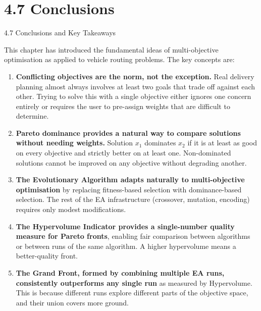 \documentclass[aspectratio=169,10pt]{beamer}
\begin{document}
\section{4.7 Conclusions}

\begin{frame}[allowframebreaks]{4.7 Conclusions and Key Takeaways}

  This chapter has introduced the fundamental ideas of multi-objective
  optimisation as applied to vehicle routing problems.  The key concepts are:

  \begin{enumerate}
    \item \textbf{Conflicting objectives are the norm, not the exception.}
      Real delivery planning almost always involves at least two goals that
      trade off against each other.  Trying to solve this with a single
      objective either ignores one concern entirely or requires the user to
      pre-assign weights that are difficult to determine.

    \item \textbf{Pareto dominance provides a natural way to compare solutions
      without needing weights.}  Solution $x_1$ dominates $x_2$ if it is at
      least as good on every objective and strictly better on at least one.
      Non-dominated solutions cannot be improved on any objective without
      degrading another.

    \item \textbf{The Evolutionary Algorithm adapts naturally to multi-objective
      optimisation} by replacing fitness-based selection with dominance-based
      selection.  The rest of the EA infrastructure (crossover, mutation,
      encoding) requires only modest modifications.

    \item \textbf{The Hypervolume Indicator provides a single-number quality
      measure for Pareto fronts}, enabling fair comparison between algorithms
      or between runs of the same algorithm.  A higher hypervolume means a
      better-quality front.

    \item \textbf{The Grand Front, formed by combining multiple EA runs,
      consistently outperforms any single run} as measured by Hypervolume.
      This is because different runs explore different parts of the objective
      space, and their union covers more ground.
  \end{enumerate}

  \framebreak


\end{frame}
\end{document}
